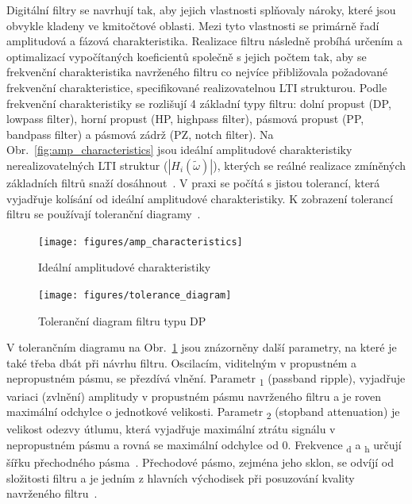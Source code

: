 Digitální filtry se navrhují tak, aby jejich vlastnosti splňovaly nároky, které
jsou obvykle kladeny ve kmitočtové oblasti. Mezi tyto vlastnosti se primárně
řadí amplitudová a fázová charakteristika. Realizace filtru následně probíhá
určením a optimalizací vypočítaných koeficientů společně s jejich počtem tak,
aby se frekvenční charakteristika navrženého filtru co nejvíce přibližovala
požadované frekvenční charakteristice, specifikované realizovatelnou LTI
strukturou. Podle frekvenční charakteristiky se rozlišují 4 základní typy
filtru: dolní propust (DP, lowpass filter), horní propust (HP, highpass filter),
pásmová propust (PP, bandpass filter) a pásmová zádrž (PZ, notch filter). Na
Obr.~\ref{fig:amp_characteristics} jsou ideální amplitudové charakteristiky
nerealizovatelných LTI struktur ($|H_i(\widetilde\omega)|$), kterých se reálné
realizace zmíněných základních filtrů snaží
dosáhnout~\cite{Skop1994,Prchal2000}. V praxi se počítá s jistou tolerancí,
která vyjadřuje kolísání od ideální amplitudové charakteristiky. K zobrazení
tolerancí filtru se používají toleranční diagramy~\cite{Prchal2000,Lyons1997}.

\begin{figure}[h]
	\centering
	\begin{minipage}[b]{0.4\textwidth}
		\texttt{[image: figures/amp\_characteristics]}
		\caption{Ideální amplitudové charakteristiky~\cite{Skop1994}}
		\label{fig:amp_characteristics}
	\end{minipage}
	\hfill
	\begin{minipage}[b]{0.5\textwidth}
		\texttt{[image: figures/tolerance\_diagram]}
		\caption{Toleranční diagram filtru typu DP~\cite{Skop1994}}
		\label{fig:tolerance_diagram}
	\end{minipage}
\end{figure}

V tolerančním diagramu na Obr.~\ref{fig:tolerance_diagram} jsou znázorněny další
parametry, na které je také třeba dbát při návrhu filtru. Oscilacím, viditelným
v propustném a nepropustném pásmu, se přezdívá vlnění. Parametr \textdelta
\textsubscript{1} (passband ripple), vyjadřuje variaci (zvlnění) amplitudy v
propustném pásmu navrženého filtru a je roven maximální odchylce o jednotkové
velikosti. Parametr \textdelta \textsubscript{2} (stopband attenuation) je
velikost odezvy útlumu, která vyjadřuje maximální ztrátu signálu v nepropustném
pásmu a rovná se maximální odchylce od 0. Frekvence \textomega \textsubscript{d}
a \textomega \textsubscript{h} určují šířku přechodného
pásma~\cite{Prchal2000,Lyons1997}. Přechodové pásmo, zejména jeho sklon, se
odvíjí od složitosti filtru a je jedním z hlavních východisek při posuzování
kvality navrženého filtru~\cite{Jan2002}.

